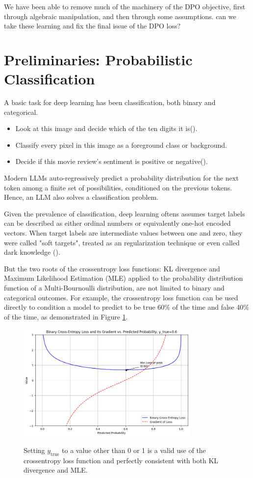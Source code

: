 \documentclass[twoside,11pt]{article}
\begin{document}
We have been able to remove much of the machinery of the DPO objective, first
through algebraic manipulation, and then through some assumptions. 
can we take these learning and fix the final issue of the DPO loss? 

\section{Preliminaries: Probabilistic Classification}

A basic task for deep learning has been classification, both
binary and categorical. 
\begin{itemize}
\item Look at this image and decide which  of the ten digits it is(\cite{lecun1998mnist}).
\item Classify every pixel in this image as a foreground class or background. 
\item Decide if this movie review's sentiment is positive or
negative(\cite{Pang+Lee:04a}).
\end{itemize}

Modern LLMs auto-regressively predict a probability distribution for 
the next token among a finite set of possibilities, conditioned on the 
previous tokens. Hence, an LLM also solves 
a classification problem. 

Given the prevalence of classification, deep learning oftens assumes
target labels can be described as either ordinal numbers
or equivalently one-hot encoded vectors. When target labels are
intermediate values between one and zero, they were called "soft targets", 
treated as an regularization technique or even called dark knowledge
(\cite{hinton2015distilling, szegedy2016rethinking,hinton2014dark}). 

But the two roots of the crossentropy
loss functions: KL divergence and Maximum Likelihood Estimation (MLE) applied
to the probability distribution function of a Multi-Bournoulli
distribution, are not limited to binary and categorical outcomes. 
For example, the crossentropy loss function can be used directly 
to condition a model to predict to be true 60\% of the time and false 40\% of 
the time, as demonstrated in Figure \ref{fig:ce06}. 
\begin{figure}[htbp]
  \centering
  \includegraphics[width=0.8\textwidth]{ce06.png}
  \label{fig:ce06}
  \caption{Setting $y_\mathrm{true}$ to a value 
  other than 0 or 1 is a valid 
  use of the crossentropy loss 
  function and perfectly consistent with
  both KL divergence and MLE.}
\end{figure}
\end{document}

